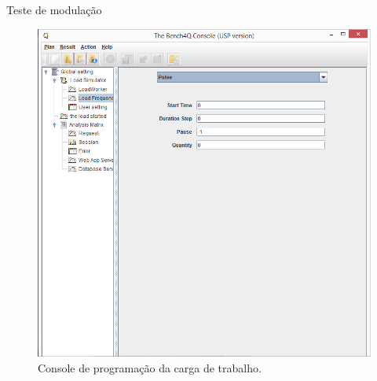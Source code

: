 \begin{frame}{Teste de modulação}
	\begin{figure}[!htb]
		\centering
		\includegraphics[scale=0.3]{../monograph/images/console-bench4Q-usp.png}
		\caption{Console de programação da carga de trabalho.}
		\label{fig:interface-criada-beanch4q}
	\end{figure}
\end{frame}

